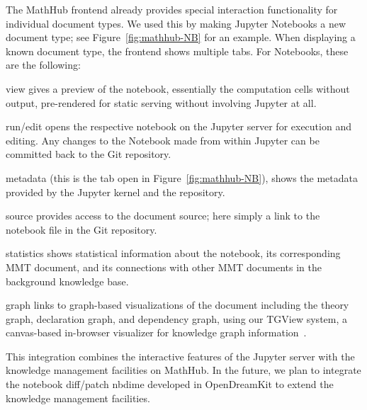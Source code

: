 The MathHub frontend already provides special interaction functionality for individual document types.
We used this by making Jupyter Notebooks a new document type; see Figure~\ref{fig:mathhub-NB} for an example.
When displaying a known document type, the frontend shows multiple tabs.
For Notebooks, these are the following:
\begin{compactenum}[\em i\rm)]
\item \textsf{view} gives a preview of the notebook, essentially the computation cells without output, pre-rendered for static serving without involving Jupyter at all.%
\item \textsf{run/edit} opens the respective notebook on the Jupyter server for execution and editing.
Any changes to the Notebook made from within Jupyter can be committed back to the Git repository. 
\item \textsf{metadata} (this is the tab open in Figure~\ref{fig:mathhub-NB}), shows the metadata provided by the Jupyter kernel and the repository. 
\item \textsf{source} provides access to the document source; here simply a link to the notebook file in the Git repository.
\item \textsf{statistics} shows statistical information about the notebook, its corresponding MMT document, and its connections with other MMT documents in the background knowledge base.
\item \textsf{graph} links to graph-based visualizations of the document including the theory graph, declaration graph, and dependency graph, using our TGView system, a canvas-based in-browser visualizer for knowledge graph information~\cite{RupKohMue:fitgv17}.
\end{compactenum}
This integration combines the interactive features of the Jupyter server with the knowledge management facilities on MathHub. In the future, we plan to integrate the notebook diff/patch \textsf{nbdime} developed in OpenDreamKit to extend the knowledge management facilities. 

